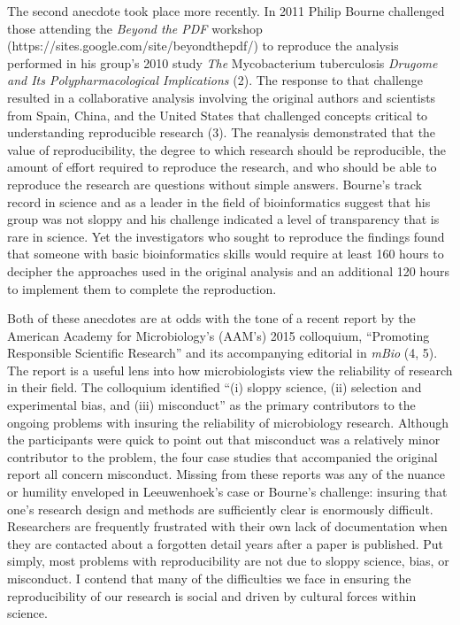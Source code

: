 \documentclass[]{article}
\begin{document}
The second anecdote took place more recently. In 2011 Philip Bourne
challenged those attending the \emph{Beyond the PDF} workshop
(https://sites.google.com/site/beyondthepdf/) to reproduce the analysis
performed in his group's 2010 study \emph{The} Mycobacterium
tuberculosis \emph{Drugome and Its Polypharmacological Implications}
(2). The response to that challenge resulted in a collaborative analysis
involving the original authors and scientists from Spain, China, and the
United States that challenged concepts critical to understanding
reproducible research (3). The reanalysis demonstrated that the value of
reproducibility, the degree to which research should be reproducible,
the amount of effort required to reproduce the research, and who should
be able to reproduce the research are questions without simple answers.
Bourne's track record in science and as a leader in the field of
bioinformatics suggest that his group was not sloppy and his challenge
indicated a level of transparency that is rare in science. Yet the
investigators who sought to reproduce the findings found that someone
with basic bioinformatics skills would require at least 160 hours to
decipher the approaches used in the original analysis and an additional
120 hours to implement them to complete the reproduction.

Both of these anecdotes are at odds with the tone of a recent report by
the American Academy for Microbiology's (AAM's) 2015 colloquium,
``Promoting Responsible Scientific Research'' and its accompanying
editorial in \emph{mBio} (4, 5). The report is a useful lens into how
microbiologists view the reliability of research in their field. The
colloquium identified ``(i) sloppy science, (ii) selection and
experimental bias, and (iii) misconduct'' as the primary contributors to
the ongoing problems with insuring the reliability of microbiology
research. Although the participants were quick to point out that
misconduct was a relatively minor contributor to the problem, the four
case studies that accompanied the original report all concern
misconduct. Missing from these reports was any of the nuance or humility
enveloped in Leeuwenhoek's case or Bourne's challenge: insuring that
one's research design and methods are sufficiently clear is enormously
difficult. Researchers are frequently frustrated with their own lack of
documentation when they are contacted about a forgotten detail years
after a paper is published. Put simply, most problems with
reproducibility are not due to sloppy science, bias, or misconduct. I
contend that many of the difficulties we face in ensuring the
reproducibility of our research is social and driven by cultural forces
within science.
\end{document}

